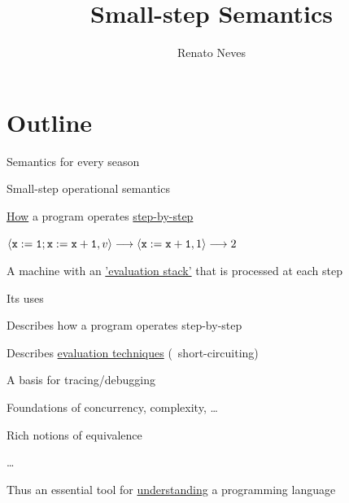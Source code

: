 \documentclass{beamer}
\author[Renato Neves]{Renato Neves}
\date{}
\begin{document}
\title{Small-step Semantics}

\frame[plain]{\titlepage}

\section{Outline}

\begin{frame}{Semantics for every season}

        \hspace*{+5pt}

\end{frame}


\begin{frame}{Small-step operational semantics}

        \alert{\underline{How}} a program operates \alert{\underline{step-by-step}}

        \begin{example}
                $\langle \mathtt{x := 1 ; x := x +1}, v \rangle \longrightarrow
                \langle \mathtt{x := x + 1}, 1 \rangle \longrightarrow 2$
        \end{example}

        A machine with an \alert{\underline{'evaluation stack'}} that is
        processed at each step 
\end{frame}

\begin{frame}{Its uses}

        Describes how a program operates step-by-step

        Describes \alert{\underline{evaluation techniques}} (\eg\
        short-circuiting)

        A basis for tracing/debugging

        Foundations of concurrency, complexity, \dots

        Rich notions of equivalence

        \dots

        \medskip
        \pause
        Thus an essential tool for \alert{\underline{understanding}} a
        programming language

\end{frame}
\end{document}
